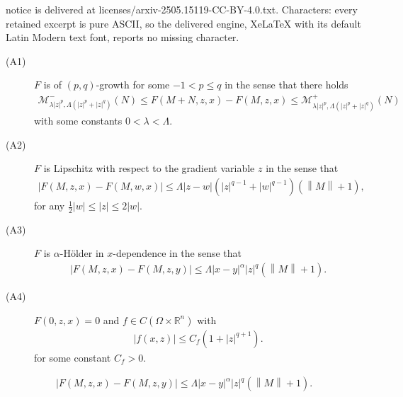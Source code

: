 \documentclass[10pt,a4paper]{amsart}
\newcommand{\norm}[1]{\left\lVert#1\right\rVert}
\begin{document}
notice is delivered at licenses/arxiv-2505.15119-CC-BY-4.0.txt. Characters: every retained excerpt is pure ASCII, so the delivered engine, XeLaTeX with its default Latin Modern text font, reports no missing character.
\begin{description}
    \item[(A1)\label{A1}] $F$ is of $(p,q)$-growth for some $-1< p\leq q$ in the sense that there holds
    \begin{align*}
        \mathcal{M}^-_{\lambda|z|^p,\Lambda(|z|^p + |z|^q)}(N) \leq F(M+N,z,x) - F(M,z,x) \leq \mathcal{M}^+_{\lambda|z|^p,\Lambda(|z|^p + |z|^q)}(N)
    \end{align*}
    with some constants $0<\lambda< \Lambda$.
    \item[(A2)\label{A2}] $F$ is Lipschitz with respect to the gradient variable $z$ in the sense that
    \begin{align*}
    |F(M,z,x) - F(M,w,x)| \leq \Lambda|z-w|(|z|^{q-1}+|w|^{q-1})(\norm{M}+1),
    \end{align*} 
    for any $ \frac{1}{2}|w|\leq |z| \leq 2|w|$.
    \item[(A3)\label{A3}] $F$ is $\alpha$-H{\"o}lder in $x$-dependence in the sense that
    \begin{align*}
    |F(M,z,x) - F(M,z,y)| \leq \Lambda|x-y|^\alpha|z|^{q}(\norm{M}+1).
    \end{align*}
    \item[(A4)\label{A4}] $F(0,z,x) =0$ and $f \in C(\Omega \times \mathbb{R}^n)$ with
    \begin{align*}
        |f(x,z)| \leq C_f(1+|z|^{q+1}).
    \end{align*}
    for some constant $C_f > 0$.
\end{description}

    \begin{align*}
    |F(M,z,x) - F(M,z,y)| \leq \Lambda|x-y|^\alpha|z|^{q}(\norm{M}+1).
    \end{align*}
\end{document}

